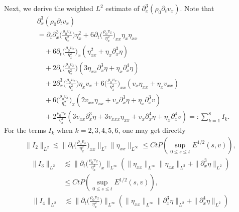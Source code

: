 \documentclass[11pt, reqno]{amsart}
\numberwithin{equation}{section}
\begin{document}
{Next, we derive the weighted \(L^2\) estimate of \(\partial_x^3(\rho_0\partial_tv_x)\).
Note that
\begin{equation*}
\begin{aligned}
&\partial_x^3(\rho_0\partial_tv_x)\\
&=\partial_t\partial_x^3\bigg({\frac{\rho_0v_x}{\eta_x^2}}\bigg)\eta_x^2
+6\partial_t\bigg(\frac{\rho_0v_x}{\eta_x^2}\bigg)_{xx}\eta_{x}\eta_{xx}\\
&\quad+6\partial_t\bigg(\frac{\rho_0v_x}{\eta_x^2}\bigg)_x(\eta_{xx}^2+\eta_{x}\partial_x^3\eta)\\
&\quad+2\partial_t\bigg(\frac{\rho_0v_x}{\eta_x^2}\bigg)(3\eta_{xx}\partial_x^3\eta+\eta_{x}\partial_x^4\eta)\\
&\quad+2\partial_x^3\bigg({\frac{\rho_0v_x}{\eta_x^2}}\bigg)\eta_xv_x
+6\bigg(\frac{\rho_0v_x}{\eta_x^2}\bigg)_{xx}(v_x\eta_{xx}+\eta_{x}v_{xx})\\
&\quad+6\bigg(\frac{\rho_0v_x}{\eta_x^2}\bigg)_{x}(2v_{xx}\eta_{xx}+v_x\partial_x^3\eta+\eta_{x}\partial_x^3v)\\
&\quad+2\frac{\rho_0v_x}{\eta_x^2}(3v_{xx}\partial_x^3\eta+3v_{xxx}\eta_{xx}+v_x\partial_x^4\eta+\eta_{x}\partial_x^4v)
=\colon\sum_{k=1}^8I_k.
\end{aligned}
\end{equation*}
For the terms \(I_k\) when \(k=2,3,4,5,6\), one may get directly
\begin{equation*}
\begin{aligned}
\|I_2\|_{L^2}
\lesssim
\bigg\|\partial_t\bigg(\frac{\rho_0v_x}{\eta_x^2}\bigg)_{xx}\bigg\|_{L^2}\|\eta_{xx}\|_{L^\infty}
\leq Ct P(\sup_{0\leq s\leq t}E^{1/2}(s,v)),
\end{aligned}
\end{equation*}
\begin{equation*}
\begin{aligned}
\|I_3\|_{L^2}&\lesssim
\bigg\|\partial_t\bigg(\frac{\rho_0v_x}{\eta_x^2}\bigg)_x\bigg\|_{L^\infty}(\|\eta_{xx}\|_{L^\infty}\|\eta_{xx}\|_{L^2}
+\|\partial_x^3\eta\|_{L^2})\\
&\leq Ct P(\sup_{0\leq s\leq t}E^{1/2}(s,v)),
\end{aligned}
\end{equation*}
\begin{equation*}
\begin{aligned}
\|I_4\|_{L^2}&\lesssim
\bigg\|\partial_t\bigg(\frac{\rho_0v_x}{\eta_x^2}\bigg)\bigg\|_{L^\infty}(\|\eta_{xx}\|_{L^\infty}\|\partial_x^3\eta\|_{L^2}
+\|\partial_x^4\eta\|_{L^2})\\

\end{aligned}
\end{equation*}}
\end{document}
